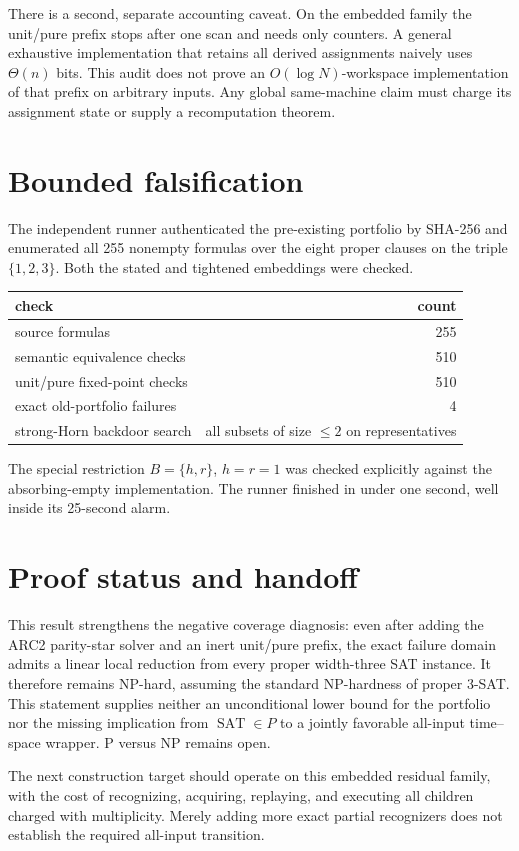\documentclass[11pt]{article}
\newcommand{\SAT}{\operatorname{SAT}}
\begin{document}
There is a second, separate accounting caveat.  On the embedded family the
unit/pure prefix stops after one scan and needs only counters.  A general
exhaustive implementation that retains all derived assignments naively uses
$\Theta(n)$ bits.  This audit does not prove an $O(\log N)$-workspace
implementation of that prefix on arbitrary inputs.  Any global same-machine
claim must charge its assignment state or supply a recomputation theorem.

\section{Bounded falsification}
The independent runner authenticated the pre-existing portfolio by SHA-256
and enumerated all 255 nonempty formulas over the eight proper clauses on the
triple $\{1,2,3\}$.  Both the stated and tightened embeddings were checked.

\begin{center}
\begin{tabular}{lr}
\toprule
check & count\\
\midrule
source formulas & 255\\
semantic equivalence checks & 510\\
unit/pure fixed-point checks & 510\\
exact old-portfolio failures & 4\\
strong-Horn backdoor search & all subsets of size $\leq2$ on representatives\\
\bottomrule
\end{tabular}
\end{center}

The special restriction $B=\{h,r\}$, $h=r=1$ was checked explicitly against
the absorbing-empty implementation.  The runner finished in under one second,
well inside its 25-second alarm.

\section{Proof status and handoff}
This result strengthens the negative coverage diagnosis: even after adding
the ARC2 parity-star solver and an inert unit/pure prefix, the exact failure
domain admits a linear local reduction from every proper width-three SAT
instance.  It therefore remains NP-hard, assuming the standard NP-hardness of
proper 3-SAT.  This statement supplies neither an unconditional lower bound
for the portfolio nor the missing implication from $\SAT\in P$ to a jointly
favorable all-input time--space wrapper.  P versus NP remains open.

The next construction target should operate on this embedded residual family,
with the cost of recognizing, acquiring, replaying, and executing all children
charged with multiplicity.  Merely adding more exact partial recognizers does
not establish the required all-input transition.
\end{document}

